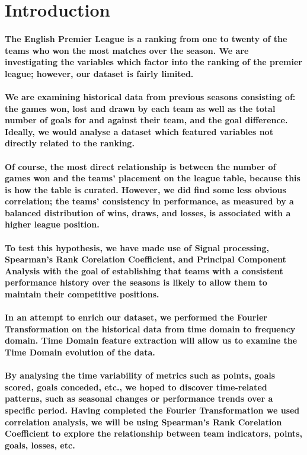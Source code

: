 \section{Introduction}
% 
% 
\paragraph{The English Premier League is a ranking from one to twenty of the teams who won the most matches over the season. We are investigating the variables which factor into the ranking of the premier league; however, our dataset is fairly limited. }
% 
% 
\paragraph{We are examining historical data from previous seasons consisting of: the games won, lost and drawn by each team as well as the total number of goals for and against their team, and the goal difference. Ideally, we would analyse a dataset which featured variables not directly related to the ranking.}
% 
% 
\paragraph{Of course, the most direct relationship is between the number of games won and the teams' placement on the league table, because this is how the table is curated. However, we did find some less obvious correlation; the teams' consistency in performance, as measured by a balanced distribution of wins, draws, and losses, is associated with a higher league position.}
% 
% 
\paragraph{To test this hypothesis, we have made use of Signal processing, Spearman's Rank Corelation Coefficient, and Principal Component Analysis with the goal of establishing that teams with a consistent performance history over the seasons is likely to allow them to maintain their competitive positions.}
% 
% 
\paragraph{In an attempt to enrich our dataset, we performed the Fourier Transformation on the historical data from time domain to frequency domain. Time Domain feature extraction will allow us to examine the Time Domain evolution of the data.}
% 
% 
\paragraph{By analysing the time variability of metrics such as points, goals scored, goals conceded, etc., we hoped to discover time-related patterns, such as seasonal changes or performance trends over a specific period. Having completed the Fourier Transformation we used correlation analysis, we will be using Spearman's Rank Corelation Coefficient to explore the relationship between team indicators, points, goals, losses, etc.}
% 
% 
